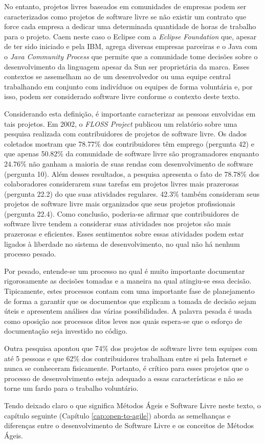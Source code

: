 No entanto, projetos livres baseados em comunidades de empresas podem
ser caracterizados como projetos de software livre se não existir um
contrato que force cada empresa a dedicar uma determinada quantidade
de horas de trabalho para o projeto. Caem neste caso o Eclipse com a
\emph{Eclipse Foundation} que, apesar de ter sido iniciado e pela IBM,
agrega diversas empresas parceiras e o Java com o \emph{Java Community
  Process} que permite que a comunidade tome decisões sobre o
desenvolvimento da linguagem apesar da Sun ser proprietária da
marca. Esses contextos se assemelham ao de um desenvolvedor ou uma
equipe central trabalhando em conjunto com indivíduos ou equipes de
forma voluntária e, por isso, podem ser considerado software livre
conforme o contexto deste texto.

Considerando esta definição, é importante caracterizar as pessoas
envolvidas em tais projetos. Em 2002, o \emph{FLOSS Project}
\cite{FlossProject} publicou um relatório sobre uma pesquisa realizada
com contribuidores de projetos de software livre. Os dados coletados
\cite{FlossStats} mostram que 78.77\% dos contribuidores têm emprego
(pergunta 42) e que apenas 50.82\% da comunidade de software livre são
programadores enquanto 24.76\% não ganham a maioria de suas rendas com
desenvolvimento de software (pergunta 10). Além desses resultados, a
pesquisa apresenta o fato de 78.78\% dos colaboradores considerarem
suas tarefas em projetos livres mais prazerosas (pergunta 22.2) do que
suas atividades regulares. 42.3\% também consideram seus projetos de
software livre mais organizados que seus projetos profissionais
(pergunta 22.4). Como conclusão, poderia-se afirmar que contribuidores
de software livre tendem a considerar suas atividades nos projetos são
mais prazerosas e eficientes. Esses sentimentos sobre essas atividades
podem estar ligados à liberdade no sistema de desenvolvimento, no qual
não há nenhum processo pesado.

Por pesado, entende-se um processo no qual é muito importante
documentar rigorosamente as decisões tomadas e a maneira na qual
atingiu-se essa decisão. Tipicamente, estes processos contam com uma
importante fase de planejamento de forma a garantir que os documentos
que explicam a tomada de decisão sejam úteis e apresentem análises das
várias possibilidades. A palavra pesada é usada como oposição aos
processos ditos leves nos quais espera-se que o esforço de
documentação seja investido no código. %

Outra pesquisa \cite{Reis2003} apontou que 74\% dos projetos de
software livre tem equipes com até 5 pessoas e que 62\% dos
contribuidores trabalham entre si pela Internet e nunca se conheceram
fisicamente. Portanto, é crítico para esses projetos que o processo de
desenvolvimento esteja adequado a essas características e não se torne
um fardo para o trabalho voluntário.

Tendo deixado claro o que significa Métodos Ágeis e Software Livre
neste texto, o capítulo seguinte (Capítulo \ref{cap:open-to-agile})
aborda as semelhanças e diferenças entre o desenvolvimento de Software
Livre e os conceitos de Métodos Ágeis.
